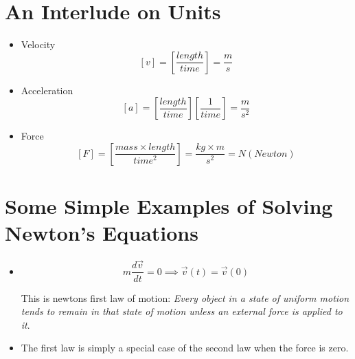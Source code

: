 \documentclass[../main.tex]{subfiles}
\begin{document}
\section{An Interlude on Units}
\begin{itemize}
    \item Velocity
        \begin{equation}
            \left[v\right] = \left[\frac{length}{time}\right] = \frac{m}{s}
        \end{equation}

    \item Acceleration
        \begin{equation}
            \left[a\right] = \left[\frac{length}{time}\right]\left[\frac{1}{time}\right] = \frac{m}{s^2}
        \end{equation}

    \item Force
        \begin{equation}
            \left[F\right] = \left[\frac{mass \times length}{time^2}\right] = \frac{kg \times m}{s^2} = N (Newton)
        \end{equation}

\end{itemize}

\section{Some Simple Examples of Solving Newton's Equations}
\begin{itemize}
    \item 
        \begin{equation}
            m \frac{d\vec{v}}{dt} = 0 \implies \vec{v}(t) = \vec{v}(0)
        \end{equation}

        This is newtons first law of motion: \textit{ Every object in a state
        of uniform motion tends to remain in that state of motion unless an
        external force is applied to it}.
        
    \item The first law is simply a special case of the second law when the
        force is zero.

\end{itemize}
\end{document}
